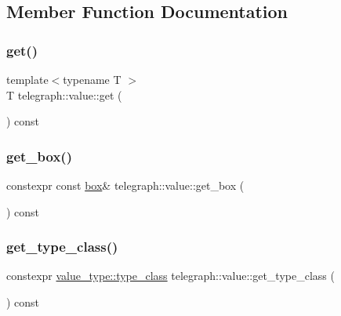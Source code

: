 \subsection{Member Function Documentation}
\mbox{\label{classtelegraph_1_1value_a201fca0737b8be3128f2770b41087540}} 
\subsubsection{\texorpdfstring{get()}{get()}}
{\footnotesize\ttfamily template$<$typename T $>$ \\
T telegraph\+::value\+::get (\begin{DoxyParamCaption}{ }\end{DoxyParamCaption}) const\hspace{0.3cm}{\ttfamily [inline]}}

\mbox{\label{classtelegraph_1_1value_a79d73fbd3e172c33f11fdf7fead2b97a}} 
\subsubsection{\texorpdfstring{get\+\_\+box()}{get\_box()}}
{\footnotesize\ttfamily constexpr const \hyperlink{uniontelegraph_1_1value_1_1box}{box}\& telegraph\+::value\+::get\+\_\+box (\begin{DoxyParamCaption}{ }\end{DoxyParamCaption}) const\hspace{0.3cm}{\ttfamily [inline]}}

\mbox{\label{classtelegraph_1_1value_ae38e5de94d5cfad919efe224da5a6c7d}} 
\subsubsection{\texorpdfstring{get\+\_\+type\+\_\+class()}{get\_type\_class()}}
{\footnotesize\ttfamily constexpr \hyperlink{classtelegraph_1_1value__type_a516081c0a4e231cb22554f48f052ff6f}{value\+\_\+type\+::type\+\_\+class} telegraph\+::value\+::get\+\_\+type\+\_\+class (\begin{DoxyParamCaption}{ }\end{DoxyParamCaption}) const\hspace{0.3cm}{\ttfamily [inline]}}


